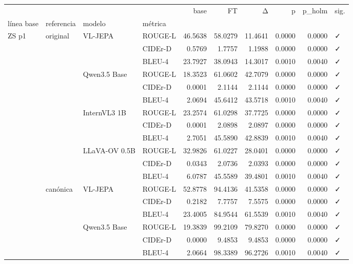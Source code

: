 \begin{tabular}{llllrrrrrl}
\toprule
 &  &  &  & base & FT & Δ & p & p\_holm & sig. \\
línea base & referencia & modelo & métrica &  &  &  &  &  &  \\
\midrule
\multirow[t]{24}{*}{ZS p1} & \multirow[t]{12}{*}{original} & \multirow[t]{3}{*}{VL-JEPA} & ROUGE-L & 46.5638 & 58.0279 & 11.4641 & 0.0000 & 0.0000 & ✓ \\
 &  &  & CIDEr-D & 0.5769 & 1.7757 & 1.1988 & 0.0000 & 0.0000 & ✓ \\
 &  &  & BLEU-4 & 23.7927 & 38.0943 & 14.3017 & 0.0010 & 0.0040 & ✓ \\
\cline{3-10}
 &  & \multirow[t]{3}{*}{Qwen3.5 Base} & ROUGE-L & 18.3523 & 61.0602 & 42.7079 & 0.0000 & 0.0000 & ✓ \\
 &  &  & CIDEr-D & 0.0001 & 2.1144 & 2.1144 & 0.0000 & 0.0000 & ✓ \\
 &  &  & BLEU-4 & 2.0694 & 45.6412 & 43.5718 & 0.0010 & 0.0040 & ✓ \\
\cline{3-10}
 &  & \multirow[t]{3}{*}{InternVL3 1B} & ROUGE-L & 23.2574 & 61.0298 & 37.7725 & 0.0000 & 0.0000 & ✓ \\
 &  &  & CIDEr-D & 0.0001 & 2.0898 & 2.0897 & 0.0000 & 0.0000 & ✓ \\
 &  &  & BLEU-4 & 2.7051 & 45.5890 & 42.8839 & 0.0010 & 0.0040 & ✓ \\
\cline{3-10}
 &  & \multirow[t]{3}{*}{LLaVA-OV 0.5B} & ROUGE-L & 32.9826 & 61.0227 & 28.0401 & 0.0000 & 0.0000 & ✓ \\
 &  &  & CIDEr-D & 0.0343 & 2.0736 & 2.0393 & 0.0000 & 0.0000 & ✓ \\
 &  &  & BLEU-4 & 6.0787 & 45.5589 & 39.4801 & 0.0010 & 0.0040 & ✓ \\
\cline{2-10} \cline{3-10}
 & \multirow[t]{12}{*}{canónica} & \multirow[t]{3}{*}{VL-JEPA} & ROUGE-L & 52.8778 & 94.4136 & 41.5358 & 0.0000 & 0.0000 & ✓ \\
 &  &  & CIDEr-D & 0.2182 & 7.7757 & 7.5575 & 0.0000 & 0.0000 & ✓ \\
 &  &  & BLEU-4 & 23.4005 & 84.9544 & 61.5539 & 0.0010 & 0.0040 & ✓ \\
\cline{3-10}
 &  & \multirow[t]{3}{*}{Qwen3.5 Base} & ROUGE-L & 19.3839 & 99.2109 & 79.8270 & 0.0000 & 0.0000 & ✓ \\
 &  &  & CIDEr-D & 0.0000 & 9.4853 & 9.4853 & 0.0000 & 0.0000 & ✓ \\
 &  &  & BLEU-4 & 2.0664 & 98.3389 & 96.2726 & 0.0010 & 0.0040 & ✓ \\

\end{tabular}
